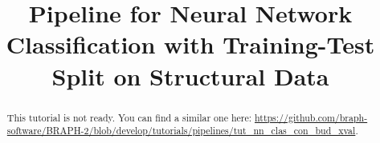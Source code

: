 \documentclass[justified]{tufte-handout}
\title[Classification Training-Test Split Structural Data]{Pipeline for Neural Network Classification with Training-Test Split on Structural Data}
\begin{document}
\maketitle

\begin{abstract}
\noindent
This tutorial is not ready. You can find a similar one here: \url{https://github.com/braph-software/BRAPH-2/blob/develop/tutorials/pipelines/tut_nn_clas_con_bud_xval}.
\end{abstract}
\end{document}
